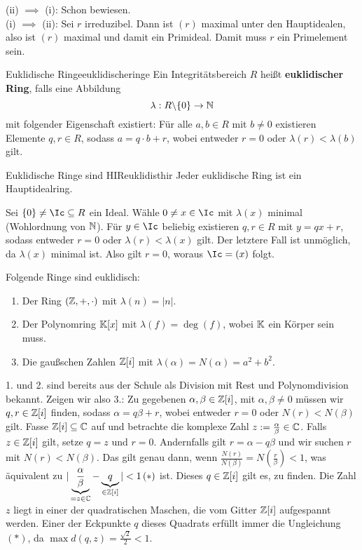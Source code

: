 \begin{beweis}
(ii) $\implies$ (i): Schon bewiesen.\\
(i) $\implies$ (ii): Sei $r$ irreduzibel. Dann ist $(r)$ maximal unter den Hauptidealen, also ist $(r)$ maximal und damit ein Primideal. Damit muss $r$ ein Primelement sein.
\end{beweis}
\begin{definition}{Euklidische Ringe}{euklidischeringe}
Ein Integritätsbereich $R$ heißt \textbf{euklidischer Ring}, falls eine Abbildung
\begin{equation}
\lambda: R \backslash \{0\} \to \mathbb{N}
\end{equation}
mit folgender Eigenschaft existiert: Für alle $a,b \in R$ mit $b \neq 0$ existieren Elemente $q, r \in R$, sodass $a = q \cdot b + r$, wobei entweder $r=0$ oder $\lambda (r) < \lambda (b)$ gilt.
\end{definition}
\begin{satz}{Euklidische Ringe sind HIR}{euklidisthir}
Jeder euklidische Ring ist ein Hauptidealring.
\end{satz}
\begin{beweis}
Sei $\{0\} \neq \Ic \sub R$ ein Ideal. Wähle $0 \neq x \in \Ic$ mit $\lambda (x)$ minimal (Wohlordnung von $\mathbb{N}$). Für $y \in \Ic$ beliebig existieren $q,r \in R$ mit $y = qx +r$, sodass entweder $r=0$ oder $\lambda(r) < \lambda (x)$ gilt. Der letztere Fall ist unmöglich, da $\lambda(x)$ minimal ist. Also gilt $r=0$, woraus $\Ic = (x)$ folgt.
\end{beweis}
\begin{beispiele}
Folgende Ringe sind euklidisch:
\begin{enumerate}
\item Der Ring $(\mathbb{Z}, +, \cdot)$ mit $\lambda (n) = |n|$.
\item Der Polynomring $\mathbb{K}[x]$ mit $\lambda(f) = \deg (f)$, wobei $\mathbb{K}$ ein Körper sein muss.
\item Die gaußschen Zahlen $\mathbb{Z}[i]$ mit $\lambda(\alpha) = N(\alpha) = a^2 +b^2$.
\end{enumerate}
\begin{beweis}
1. und 2. sind bereits aus der Schule als Division mit Rest und Polynomdivision bekannt. Zeigen wir also 3.: Zu gegebenen $\alpha, \beta \in \mathbb{Z}[i]$, mit $\alpha, \beta \neq 0$ müssen wir $q,r \in \mathbb{Z}[i]$ finden, sodass $\alpha = q \beta +r$, wobei entweder $r=0$ oder $N(r) < N(\beta)$ gilt. Fasse $\mathbb{Z}[i] \subseteq \mathbb{C}$ auf und betrachte die komplexe Zahl $z:= \frac{\alpha}{\beta} \in \mathbb{C}$. Falls $z \in \mathbb{Z}[i]$ gilt, setze $q = z$ und $r=0$. Andernfalls gilt $r = \alpha - q \beta$ und wir suchen $r$ mit $N(r) < N(\beta)$. Das gilt genau dann, wenn $\frac{N(r)}{N(\beta)} = N\left(\frac{r}{\beta}\right) < 1$, was äquivalent zu $| \underbrace{\frac{\alpha}{\beta}}_{=z \in \mathbb{C}} -\underbrace{q}_{\in \mathbb{Z}[i]} | < 1 \, (\ast)$ ist. Dieses $q\in \mathbb{Z}[i]$ gilt es, zu finden. Die Zahl $z$ liegt in einer der quadratischen Maschen, die vom Gitter $\mathbb{Z}[i]$ aufgespannt werden. Einer der Eckpunkte $q$ dieses Quadrats erfüllt immer die Ungleichung $(\ast)$, da $\max d(q,z) = \frac{\sqrt{2}}{2} < 1$.
\end{beweis}
\end{beispiele}